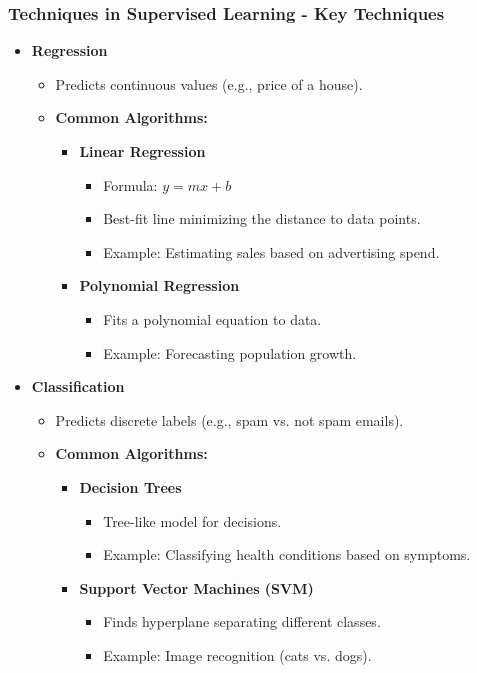\documentclass[aspectratio=169]{beamer}
\begin{document}
\begin{frame}[fragile]
  \frametitle{Techniques in Supervised Learning - Key Techniques}
  \begin{itemize}
    \item \textbf{Regression}
      \begin{itemize}
        \item Predicts continuous values (e.g., price of a house).
        \item \textbf{Common Algorithms:}
          \begin{itemize}
            \item \textbf{Linear Regression}
              \begin{itemize}
                \item Formula: \( y = mx + b \)
                \item Best-fit line minimizing the distance to data points.
                \item Example: Estimating sales based on advertising spend.
              \end{itemize}
            \item \textbf{Polynomial Regression}
              \begin{itemize}
                \item Fits a polynomial equation to data.
                \item Example: Forecasting population growth.
              \end{itemize}
          \end{itemize}
      \end{itemize}
    \item \textbf{Classification}
      \begin{itemize}
        \item Predicts discrete labels (e.g., spam vs. not spam emails).
        \item \textbf{Common Algorithms:}
          \begin{itemize}
            \item \textbf{Decision Trees}
              \begin{itemize}
                \item Tree-like model for decisions.
                \item Example: Classifying health conditions based on symptoms.
              \end{itemize}
            \item \textbf{Support Vector Machines (SVM)}
              \begin{itemize}
                \item Finds hyperplane separating different classes.
                \item Example: Image recognition (cats vs. dogs).
              \end{itemize}
          \end{itemize}
      \end{itemize}
  \end{itemize}
\end{frame}
\end{document}

